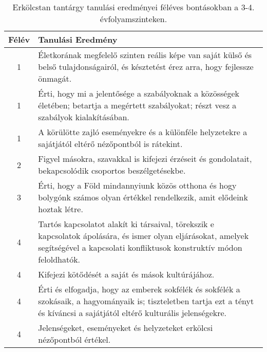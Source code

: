             \clearpage

       
           \begin{longtable}{c | p{12cm} }
            \caption[Erkölcstan 3-4.]{Erkölcstan tantárgy tanulási eredményei féléves bontásokban a 3-4. évfolyamszinteken. }  \\

            \textbf{Félév} & \textbf{Tanulási Eredmény} \\
            \hline
            \endhead
                                
                                          1 &  Életkorának megfelelő szinten reális képe van saját külső és belső tulajdonságairól, és késztetést érez arra, hogy fejlessze önmagát. \\ \hline
                                          1 &  Érti, hogy mi a jelentősége a szabályoknak a közösségek életében; betartja a megértett szabályokat; részt vesz a szabályok kialakításában. \\ \hline
                                          1 &  A körülötte zajló eseményekre és a különféle helyzetekre a sajátjától eltérő nézőpontból is rátekint. \\ \hline
                                      
                                
                                          2 &  Figyel másokra, szavakkal is kifejezi érzéseit és gondolatait, bekapcsolódik csoportos beszélgetésekbe. \\ \hline
                                      
                                
                                          3 &  Érti, hogy a Föld mindannyiunk közös otthona és hogy bolygónk számos olyan értékkel rendelkezik, amit elődeink hoztak létre. \\ \hline
                                      
                                
                                          4 &  Tartós kapcsolatot alakít ki társaival, törekszik e kapcsolatok ápolására, és ismer olyan eljárásokat, amelyek segítségével a kapcsolati konfliktusok konstruktív módon feloldhatók. \\ \hline
                                          4 &  Kifejezi kötődését a saját és mások kultúrájához. \\ \hline
                                          4 &  Érti és elfogadja, hogy az emberek sokfélék és sokfélék a szokásaik, a hagyományaik is; tiszteletben tartja ezt a tényt és kíváncsi a sajátjától eltérő kulturális jelenségekre. \\ \hline
                                          4 &  Jelenségeket, eseményeket és helyzeteket erkölcsi nézőpontból értékel. \\ \hline
                                      
                        \end{longtable}
            \clearpage

